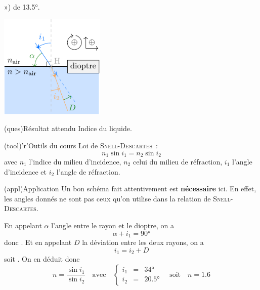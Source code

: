 \documentclass[../../main/main.tex]{subfiles}
\begin{document}
{\begin{tcb}[sidebyside, righthand ratio=.45]
\begin{enumerate}
			      ») de \ang{13.5;;}.
		\end{enumerate}
		\tcblower
		\begin{center}
			\includegraphics[width=5cm]{dioptre_alpha-horiz.pdf}
		\end{center}
	\end{tcb}
	\begin{tcbraster}[raster columns=6, raster equal height=rows]
		\begin{tcb}[raster multicolumn=2](ques){Résultat attendu}
			Indice du liquide.
		\end{tcb}
		\begin{tcb}[raster multicolumn=4](tool)'r'{Outils du cours}
			Loi de \textsc{Snell-Descartes}~:
			\[
				\boxed{n_1\sin i_1 = n_2 \sin i_2}
			\]
			avec $n_1$ l'indice du milieu d'incidence, $n_2$ celui du milieu
			de réfraction, $i_1$ l'angle d'incidence et $i_2$ l'angle de
			réfraction.
		\end{tcb}
	\end{tcbraster}

	\begin{tcb}(appl){Application}
		Un bon schéma fait attentivement est \textbf{nécessaire} ici. En effet,
		les angles donnés ne sont pas ceux qu'on utilise dans la relation de
		\textsc{Snell-Descartes}. \bigbreak

		En appelant $\alpha$ l'angle entre le rayon et le dioptre, on a
		\[ \alpha + i_1 = \ang{90;;}\]
		donc . Et en appelant $D$ la déviation entre
		les deux rayons, on a
		\[ i_1 = i_2 + D\]
		soit . On en déduit donc
		\[\boxed{n = \frac{\sin i_1}{\sin i_2}} \quad \text{avec} \quad
			\left\{
			\begin{array}{rcl}
				i_1 & = & \ang{34;;}   \\
				i_2 & = & \ang{20.5;;}
			\end{array}
			\right. \quad \text{soit} \quad \boxed{n = 1.6}
		\]
	\end{tcb}
}
\end{document}
